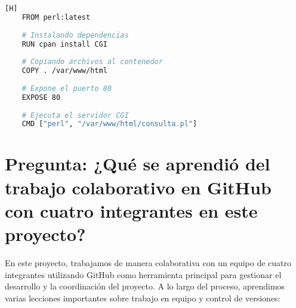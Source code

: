 \documentclass{article}
\begin{document}
    \begin{lstlisting}[language=bash,caption={Dockerfile para el despliegue}][H]
    FROM perl:latest
    
    # Instalando dependencias
    RUN cpan install CGI
    
    # Copiando archivos al contenedor
    COPY . /var/www/html
    
    # Expone el puerto 80
    EXPOSE 80
    
    # Ejecuta el servidor CGI
    CMD ["perl", "/var/www/html/consulta.pl"]
    \end{lstlisting}
    

    \section{Pregunta: ¿Qué se aprendió del trabajo colaborativo en GitHub con cuatro integrantes en este proyecto?}
    
    En este proyecto, trabajamos de manera colaborativa con un equipo de cuatro integrantes utilizando GitHub como herramienta principal para gestionar el desarrollo y la coordinación del proyecto. A lo largo del proceso, aprendimos varias lecciones importantes sobre trabajo en equipo y control de versiones:
    
\end{document}
